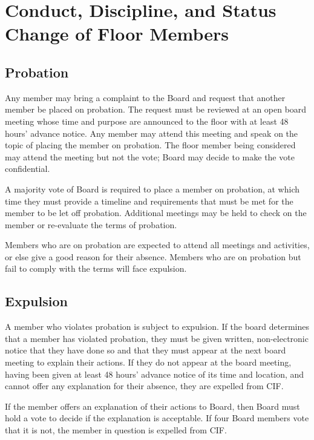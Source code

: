 \section {Conduct, Discipline, and Status Change of Floor Members}
\label{sec:conduct-and-discipline}



	\subsection {Probation}

Any member may bring a complaint to the Board and request that another member be placed on probation. The request must be reviewed at an open board meeting whose time and purpose are announced to the floor with at least 48 hours' advance notice. Any member may attend this meeting and speak on the topic of placing the member on probation. The floor member being considered may attend the meeting but not the vote; Board may decide to make the vote confidential.

A majority vote of Board is required to place a member on probation, at which time they must provide a timeline and requirements that must be met for the member to be let off probation. Additional meetings may be held to check on the member or re-evaluate the terms of probation.

Members who are on probation are expected to attend all meetings and activities, or else give a good reason for their absence. Members who are on probation but fail to comply with the terms will face expulsion.



	\subsection {Expulsion}

A member who violates probation is subject to expulsion. If the board determines that a member has violated probation, they must be given written, non-electronic notice that they have done so and that they must appear at the next board meeting to explain their actions. If they do not appear at the board meeting, having been given at least 48 hours' advance notice of its time and location, and cannot offer any explanation for their absence, they are expelled from CIF.

If the member offers an explanation of their actions to Board, then Board must hold a vote to decide if the explanation is acceptable. If four Board members vote that it is not, the member in question is expelled from CIF.

